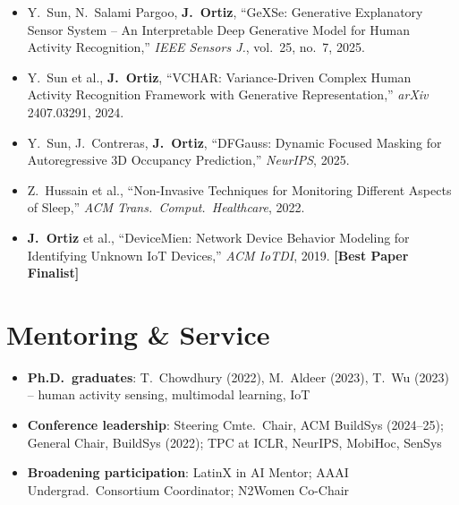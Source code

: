 \documentclass[11pt,letterpaper]{article}
\begin{document}
{\small\begin{itemize}
\item Y.\ Sun, N.\ Salami Pargoo, \textbf{J.\ Ortiz}, ``GeXSe: Generative Explanatory Sensor System -- An Interpretable Deep Generative Model for Human Activity Recognition,'' \textit{IEEE Sensors J.}, vol.~25, no.~7, 2025.

\item Y.\ Sun et al., \textbf{J.\ Ortiz}, ``VCHAR: Variance-Driven Complex Human Activity Recognition Framework with Generative Representation,'' \textit{arXiv} 2407.03291, 2024.

\item Y.\ Sun, J.\ Contreras, \textbf{J.\ Ortiz}, ``DFGauss: Dynamic Focused Masking for Autoregressive 3D Occupancy Prediction,'' \textit{NeurIPS}, 2025.

\item Z.\ Hussain et al., ``Non-Invasive Techniques for Monitoring Different Aspects of Sleep,'' \textit{ACM Trans.\ Comput.\ Healthcare}, 2022.

\item \textbf{J.\ Ortiz} et al., ``DeviceMien: Network Device Behavior Modeling for Identifying Unknown IoT Devices,'' \textit{ACM IoTDI}, 2019. \textbf{[Best Paper Finalist]}
\end{itemize}}

\section{Mentoring \& Service}

{\small\begin{itemize}
\item \textbf{Ph.D.\ graduates}: T.\ Chowdhury (2022), M.\ Aldeer (2023), T.\ Wu (2023) -- human activity sensing, multimodal learning, IoT
\item \textbf{Conference leadership}: Steering Cmte.\ Chair, ACM BuildSys (2024--25); General Chair, BuildSys (2022); TPC at ICLR, NeurIPS, MobiHoc, SenSys
\item \textbf{Broadening participation}: LatinX in AI Mentor; AAAI Undergrad.\ Consortium Coordinator; N2Women Co-Chair
\end{itemize}}
\end{document}

